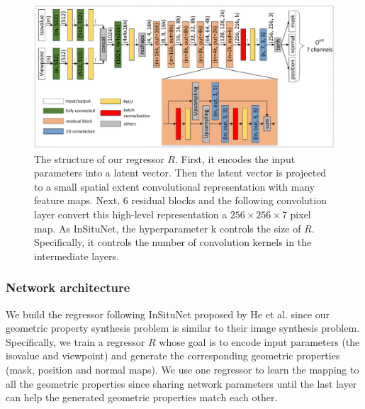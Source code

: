 \documentclass[journal]{vgtc}                %
\begin{document}
\begin{figure}
  \centering
  \includegraphics[width=1\linewidth]{regressor}
  \caption{The structure of our regressor $R$. First, it encodes the input parameters into a latent vector. Then the latent vector is projected to a small spatial extent convolutional representation with many feature maps. Next, $6$ residual blocks and the following convolution layer convert this high-level representation a $256 \times 256 \times 7$ pixel map. As InSituNet, the hyperparameter k controls the size of $R$. Specifically, it controls the number of convolution kernels in the intermediate layers.}
  \label{fig:regressor}
\end{figure}

\subsubsection{Network architecture}
We build the regressor following InSituNet proposed by He et al. \cite{he2019insitunet} since our geometric property synthesis problem is similar to their image synthesis problem. Specifically, we train a regressor $R$ whose goal is to encode input parameters (the isovalue and viewpoint) and generate the corresponding geometric properties (mask, position and normal maps). We use one regressor to learn the mapping to all the geometric properties since sharing network parameters until the last layer can help the generated geometric properties match each other.
\end{document}
